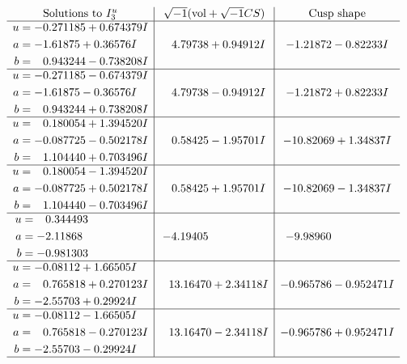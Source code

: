 \documentclass[1p]{elsarticle_modified}
\theoremstyle{definition}
\newcommand{\I}{\sqrt{-1}}
\begin{document}
$$\begin{array}{c|c|c}  
\text{Solutions to }I^u_{3}& \I (\text{vol} + \sqrt{-1}CS) & \text{Cusp shape}\\
 \hline 
\begin{aligned}
u &= -0.271185 + 0.674379 I \\
a &= -1.61875 + 0.36576 I \\
b &= \phantom{-}0.943244 - 0.738208 I\end{aligned}
 & \phantom{-}4.79738 + 0.94912 I & -1.21872 - 0.82233 I \\ \hline\begin{aligned}
u &= -0.271185 - 0.674379 I \\
a &= -1.61875 - 0.36576 I \\
b &= \phantom{-}0.943244 + 0.738208 I\end{aligned}
 & \phantom{-}4.79738 - 0.94912 I & -1.21872 + 0.82233 I \\ \hline\begin{aligned}
u &= \phantom{-}0.180054 + 1.394520 I \\
a &= -0.087725 - 0.502178 I \\
b &= \phantom{-}1.104440 + 0.703496 I\end{aligned}
 & \phantom{-}0.58425 - 1.95701 I & -10.82069 + 1.34837 I \\ \hline\begin{aligned}
u &= \phantom{-}0.180054 - 1.394520 I \\
a &= -0.087725 + 0.502178 I \\
b &= \phantom{-}1.104440 - 0.703496 I\end{aligned}
 & \phantom{-}0.58425 + 1.95701 I & -10.82069 - 1.34837 I \\ \hline\begin{aligned}
u &= \phantom{-}0.344493\phantom{ +0.000000I} \\
a &= -2.11868\phantom{ +0.000000I} \\
b &= -0.981303\phantom{ +0.000000I}\end{aligned}
 & -4.19405\phantom{ +0.000000I} & -9.98960\phantom{ +0.000000I} \\ \hline\begin{aligned}
u &= -0.08112 + 1.66505 I \\
a &= \phantom{-}0.765818 + 0.270123 I \\
b &= -2.55703 + 0.29924 I\end{aligned}
 & \phantom{-}13.16470 + 2.34118 I & -0.965786 - 0.952471 I \\ \hline\begin{aligned}
u &= -0.08112 - 1.66505 I \\
a &= \phantom{-}0.765818 - 0.270123 I \\
b &= -2.55703 - 0.29924 I\end{aligned}
 & \phantom{-}13.16470 - 2.34118 I & -0.965786 + 0.952471 I\\
 \hline 
 \end{array}$$\newpage
\end{document}
